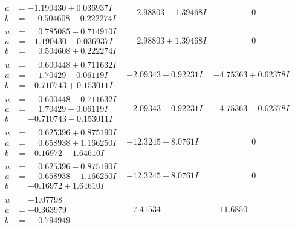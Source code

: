 \documentclass[1p]{elsarticle_modified}
\theoremstyle{definition}
\begin{document}
$$\begin{array}{c|c|c}
\begin{aligned}
a &= -1.190430 + 0.036937 I \\
b &= \phantom{-}0.504608 - 0.222274 I\end{aligned}
 & \phantom{-}2.98803 - 1.39468 I & \phantom{-0.000000 } 0 \\ \hline\begin{aligned}
u &= \phantom{-}0.785085 - 0.714910 I \\
a &= -1.190430 - 0.036937 I \\
b &= \phantom{-}0.504608 + 0.222274 I\end{aligned}
 & \phantom{-}2.98803 + 1.39468 I & \phantom{-0.000000 } 0 \\ \hline\begin{aligned}
u &= \phantom{-}0.600448 + 0.711632 I \\
a &= \phantom{-}1.70429 + 0.06119 I \\
b &= -0.710743 + 0.153011 I\end{aligned}
 & -2.09343 + 0.92231 I & -4.75363 + 0.62378 I \\ \hline\begin{aligned}
u &= \phantom{-}0.600448 - 0.711632 I \\
a &= \phantom{-}1.70429 - 0.06119 I \\
b &= -0.710743 - 0.153011 I\end{aligned}
 & -2.09343 - 0.92231 I & -4.75363 - 0.62378 I \\ \hline\begin{aligned}
u &= \phantom{-}0.625396 + 0.875190 I \\
a &= \phantom{-}0.658938 + 1.166250 I \\
b &= -0.16972 - 1.64610 I\end{aligned}
 & -12.3245 + 8.0761 I & \phantom{-0.000000 } 0 \\ \hline\begin{aligned}
u &= \phantom{-}0.625396 - 0.875190 I \\
a &= \phantom{-}0.658938 - 1.166250 I \\
b &= -0.16972 + 1.64610 I\end{aligned}
 & -12.3245 - 8.0761 I & \phantom{-0.000000 } 0 \\ \hline\begin{aligned}
u &= -1.07798\phantom{ +0.000000I} \\
a &= -0.363979\phantom{ +0.000000I} \\
b &= \phantom{-}0.794949\phantom{ +0.000000I}\end{aligned}
 & -7.41534\phantom{ +0.000000I} & -11.6850\phantom{ +0.000000I} \\ \hline\begin{aligned}

\end{aligned}
\end{array}$$
\end{document}
